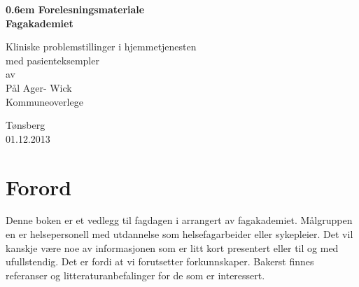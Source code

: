 \documentclass[a4paper,12pt,twoside]{memoir}
\begin{document}
			\renewcommand{\chaptername}{Del}
            \renewcommand{\contentsname}{Innhold}
            \renewcommand\listfigurename{Illustrasjoner}
            \renewcommand\tablename{Tabell}
			\renewcommand\listtablename{Tabeller}
            \renewcommand{\figurename}{Illustrasjon}


\frontmatter

	\newcommand\nbvspace[1][3]{\vspace*{\stretch{#1}}}
	\newcommand\nbstretchyspace{\spaceskip0.5em plus 0.25em minus 0.25em}
	\newcommand{\nbtitlestretch}{\spaceskip0.6em}
	\pagestyle{empty}
	\begin{center}
	\bfseries
	\nbvspace[1]
	\Huge
	{\nbtitlestretch\huge
	Forelesningsmateriale\\ Fagakademiet}

	\nbvspace[1]
	\normalsize

	Kliniske problemstillinger i hjemmetjenesten\\
	med pasienteksempler\\
	\nbvspace[1]
	\small av\\
	\Large Pål Ager- Wick\\[0.5em]
	\footnotesize Kommuneoverlege\\

	\nbvspace[2]

	\nbvspace[3]
	\normalsize

	Tønsberg\\
	\large
	01.12.2013\\
	\nbvspace[1]
	\end{center}


		\chapter{Forord}%
				Denne boken er et vedlegg til fagdagen i arrangert av fagakademiet. Målgruppen en er helsepersonell med utdannelse som helsefagarbeider eller sykepleier. Det vil kanskje være noe av informasjonen som er litt kort presentert eller til og med ufullstendig. Det er fordi at vi forutsetter forkunnskaper. Bakerst finnes referanser og litteraturanbefalinger for de som er interessert.
				\\[0.7in]
\end{document}
